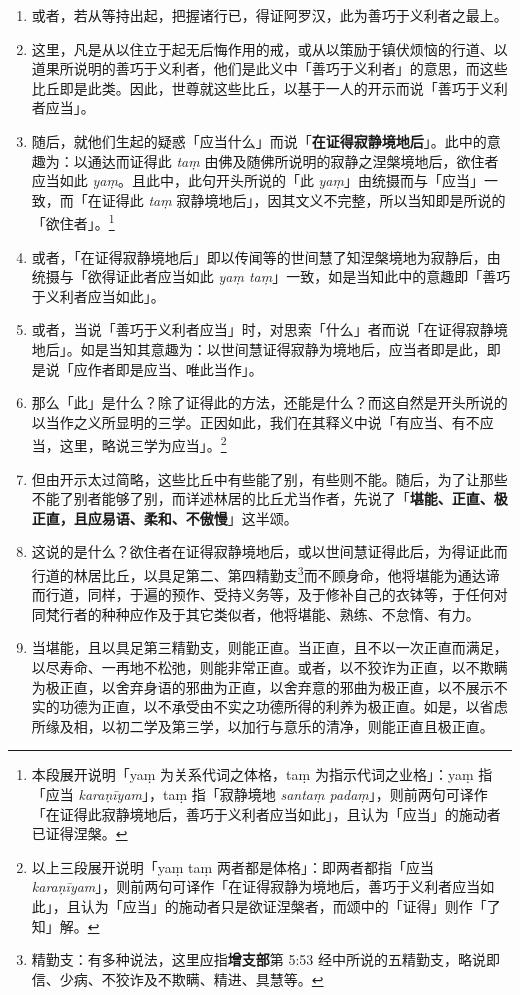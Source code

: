 \begin{enumerate}
\item 或者，若从等持出起，把握诸行已，得证阿罗汉，此为善巧于义利者之最上。
\item 这里，凡是从以住立于起无后悔作用的戒，或从以策励于镇伏烦恼的行道、以道果所说明的善巧于义利者，他们是此义中「善巧于义利者」的意思，而这些比丘即是此类。因此，世尊就这些比丘，以基于一人的开示而说「善巧于义利者应当」。
\item 随后，就他们生起的疑惑「应当什么」而说「\textbf{在证得寂静境地后}」。此中的意趣为：以通达而证得此 \textit{taṃ} 由佛及随佛所说明的寂静之涅槃境地后，欲住者应当如此 \textit{yaṃ}。且此中，此句开头所说的「此 \textit{yaṃ}」由统摄而与「应当」一致，而「在证得此 \textit{taṃ} 寂静境地后」，因其文义不完整，所以当知即是所说的「欲住者」。\footnote{本段展开说明「yaṃ 为关系代词之体格，taṃ 为指示代词之业格」：yaṃ 指「应当 \textit{karaṇīyam}」，taṃ 指「寂静境地 \textit{santaṃ padaṃ}」，则前两句可译作「在证得此寂静境地后，善巧于义利者应当如此」，且认为「应当」的施动者已证得涅槃。}
\item 或者，「在证得寂静境地后」即以传闻等的世间慧了知涅槃境地为寂静后，由统摄与「欲得证此者应当如此 \textit{yaṃ taṃ}」一致，如是当知此中的意趣即「善巧于义利者应当如此」。
\item 或者，当说「善巧于义利者应当」时，对思索「什么」者而说「在证得寂静境地后」。如是当知其意趣为：以世间慧证得寂静为境地后，应当者即是此，即是说「应作者即是应当、唯此当作」。
\item 那么「此」是什么？除了证得此的方法，还能是什么？而这自然是开头所说的以当作之义所显明的三学。正因如此，我们在其释义中说「有应当、有不应当，这里，略说三学为应当」。\footnote{以上三段展开说明「yaṃ taṃ 两者都是体格」：即两者都指「应当 \textit{karaṇīyam}」，则前两句可译作「在证得寂静为境地后，善巧于义利者应当如此」，且认为「应当」的施动者只是欲证涅槃者，而颂中的「证得」则作「了知」解。}
\item 但由开示太过简略，这些比丘中有些能了别，有些则不能。随后，为了让那些不能了别者能够了别，而详述林居的比丘尤当作者，先说了「\textbf{堪能、正直、极正直，且应易语、柔和、不傲慢}」这半颂。
\item 这说的是什么？欲住者在证得寂静境地后，或以世间慧证得此后，为得证此而行道的林居比丘，以具足第二、第四精勤支\footnote{精勤支：有多种说法，这里应指\textbf{增支部}第 5:53 经中所说的五精勤支，略说即信、少病、不狡诈及不欺瞒、精进、具慧等。}而不顾身命，他将堪能为通达谛而行道，同样，于遍的预作、受持义务等，及于修补自己的衣钵等，于任何对同梵行者的种种应作及于其它类似者，他将堪能、熟练、不怠惰、有力。
\item 当堪能，且以具足第三精勤支，则能正直。当正直，且不以一次正直而满足，以尽寿命、一再地不松弛，则能非常正直。或者，以不狡诈为正直，以不欺瞒为极正直，以舍弃身语的邪曲为正直，以舍弃意的邪曲为极正直，以不展示不实的功德为正直，以不承受由不实之功德所得的利养为极正直。如是，以省虑所缘及相，以初二学及第三学，以加行与意乐的清净，则能正直且极正直。

\end{enumerate}
